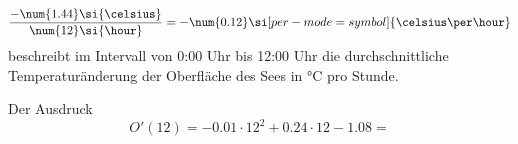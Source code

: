 \begin{exercise}
\begin{enumerate}[a)]
\begin{equation*}
              \frac{-\num{1.44}\si{\celsius}}{\num{12}\si{\hour}}=
              -\num{0.12}\si[per-mode=symbol]{\celsius\per\hour}
            \end{equation*}
            beschreibt im Intervall von 0:00 Uhr bis
            12:00 Uhr die durchschnittliche
            Temperaturänderung der Oberfläche des
            Sees in \si{\celsius} pro Stunde.
            \par
            Der Ausdruck
            \begin{equation*}
              O'(\num{12})=-\num{0.01}\cdot\num{12}^{2}+\num{0.24}\cdot\num{12}-\num{1.08}=

\end{equation*}
\end{enumerate}
\end{exercise}
